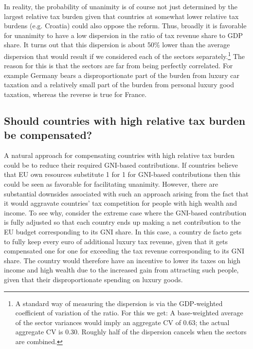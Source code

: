 \documentclass[../../main]{subfiles}
\begin{document}
In reality, the probability of unanimity is of course not just determined by the largest relative tax burden given that countries at somewhat lower relative tax burdens (e.g. Croatia) could also oppose the reform. Thus, broadly it is favorable for unanimity to have a low dispersion in the ratio of tax revenue share to GDP share. It turns out that this dispersion is about 50\% lower than the average dispersion that would result if we considered each of the sectors separately.\footnote{A standard way of measuring the dispersion is via the GDP-weighted coefficient of variation of the ratio. For this we get: A base-weighted average of the sector variances would imply an aggregate CV of 0.63; the actual aggregate CV is 0.30. Roughly half of the dispersion cancels when the sectors are combined. } The reason for this is that the sectors are far from being perfectly correlated. For example Germany bears a disproportionate part of the burden from luxury car taxation and a relatively small part of the burden from personal luxury good taxation, whereas the reverse is true for France. 


 \subsection{Should countries with high relative tax burden be compensated?}

A natural approach for compensating countries with high relative tax burden could be to reduce their required GNI-based contributions. If countries believe that EU own resources substitute 1 for 1 for GNI-based contributions then this  could be seen as favorable for facilitating unanimity. However, there are substantial downsides associated with such an approach arising from the fact that it would aggravate countries' tax competition for people with high wealth and income. To see why, consider the extreme case where the GNI-based contribution is fully adjusted so that each country ends up making a net contribution to the EU budget corresponding to its GNI share. In this case, a country de facto gets to fully keep every euro of additional luxury tax revenue, given that it gets compensated one for one for exceeding the tax revenue corresponding to its GNI share. The country would therefore have an incentive to lower its taxes on high income and high wealth due to the increased gain from attracting such people, given that their disproportionate spending on luxury goods.
\end{document}

